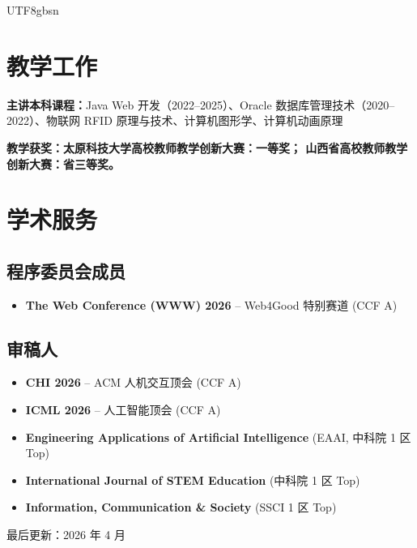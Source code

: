 \documentclass[a4paper,10pt]{article}
\begin{document}
\begin{CJK*}{UTF8}{gbsn}
\section*{教学工作}

\noindent
\textbf{主讲本科课程：}Java Web 开发（2022--2025）、Oracle 数据库管理技术（2020--2022）、物联网 RFID 原理与技术、计算机图形学、计算机动画原理

\noindent
\textbf{教学获奖：太原科技大学高校教师教学创新大赛：一等奖；
山西省高校教师教学创新大赛：省三等奖。}

\section*{学术服务}

\subsection*{程序委员会成员}
\begin{itemize}[leftmargin=*]
    \item \textbf{The Web Conference (WWW) 2026} -- Web4Good 特别赛道 (CCF A)
\end{itemize}

\subsection*{审稿人}
\begin{itemize}[leftmargin=*]
    \item \textbf{CHI 2026} -- ACM 人机交互顶会 (CCF A)
    \item \textbf{ICML 2026} -- 人工智能顶会 (CCF A)
    \item \textbf{Engineering Applications of Artificial Intelligence} (EAAI, 中科院 1 区 Top)
    \item \textbf{International Journal of STEM Education} (中科院 1 区 Top)
    \item \textbf{Information, Communication \& Society} (SSCI 1 区 Top)
\end{itemize}


\vfill
\begin{center}
    \small 最后更新：2026 年 4 月
\end{center}

\ifPDFTeX
\end{CJK*}
\fi
\end{document}
